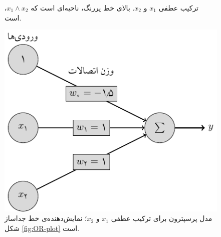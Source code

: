 \documentclass[11pt, twoside]{imsproc}
\begin{document}
\begin{figure}[t]
\begin{minipage}{.28\textwidth}
			\caption{ترکیب عطفی $x_1$ و $x_2$.
بالای	خط پررنگ، ناحیه‌ای است که
$x_1 \wedge x_2$،
است.}
			\label{fig:OR-plot}
	\end{minipage}
	\hfill
    \begin{minipage}{0.33\textwidth}
        \centering
			\includegraphics[width=1\linewidth]{images/perceptron_or}
			\caption{مدل پرسپترون برای ترکیب عطفی $x_1$ و $x_2$؛
نمایش‌دهنده‌ی خط جداساز شکل 
\ref{fig:OR-plot}
است.}
			\label{fig:perceptron_or}
    \end{minipage}
\end{figure}
\end{document}
